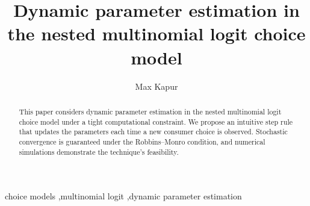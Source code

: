 \documentclass[preprint,12pt,authoryear]{elsarticle}
\begin{document}
\begin{frontmatter}


 \title{Dynamic parameter estimation in the nested multinomial logit choice model}
 \author{Max Kapur}
 \address{Seoul National University, Department of Industrial Engineering, 39-411, 1 Gwanak-ro, Gwanak-gu, Seoul 08826, Republic of Korea}

\begin{abstract}
This paper considers dynamic parameter estimation in the nested multinomial logit choice model under a tight computational constraint. We propose an intuitive step rule that updates the parameters each time a new consumer choice is observed. Stochastic convergence is guaranteed under the Robbins--Monro condition, and numerical simulations demonstrate the technique's feasibility.
\end{abstract}



\begin{keyword}
choice models \sep multinomial logit \sep dynamic parameter estimation



\end{keyword}

\end{frontmatter}
\end{document}
